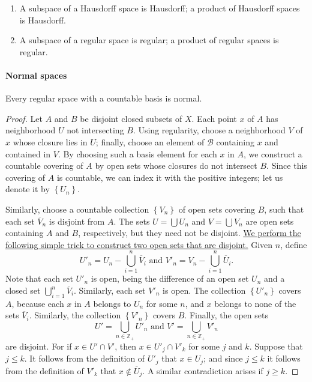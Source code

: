 \begin{theorem}
  \begin{enumerate}
    \item A subspace of a Hausdorff space is Hausdorff;
      a product of Hausdorff spaces is Hausdorff.
    \item A subspace of a regular space is regular;
      a product of regular spaces is regular.
  \end{enumerate}
\end{theorem}

\paragraph{Normal spaces}

\begin{theorem}
  Every regular space with a countable basis is normal.
\end{theorem}
\begin{proof}
  Let \( A \) and \( B \) be disjoint closed subsets of \( X \).
  Each point \( x \) of \( A \) has neighborhood \( U \) not intersecting \( B \).
  Using regularity, choose a neighborhood \( V \) of \( x \) whose closure lies in \( U \);
  finally, choose an element of \( \mathcal{B} \) containing \( x \) and contained in \( V \).
  By choosing such a basis element for each \( x \) in \( A \), we construct a countable covering of \( A \) by open sets whose closures do not intersect \( B \).
  Since this covering of \( A \) is countable, we can index it with the positive integers; let us denote it by \( \left\lbrace U_n \right\rbrace \).

  Similarly, choose a countable collection \( \left\lbrace V_n \right\rbrace \) of open sets covering \( B \), such that each set \( \overline{V}_n \) is disjoint from \( A \).
  The sets \( U = \bigcup U_n \) and \( V = \bigcup V_n \) are open sets containing \( A \) and \( B \), respectively, but they need not be disjoint.
  \underline{We perform the following simple trick to construct two open sets that are disjoint.}
  Given \( n \), define
  \[
    U'_n = U_n - \bigcup_{i = 1}^n \overline{V}_i \text{ and } V'_n = V_n - \bigcup_{i = 1}^n \overline{U}_i.
  \]
  Note that each set \( U'_n \) is open, being the difference of an open set \( U_n \) and a closed set \( \bigcup_{i=1}^n \overline{V}_i \).
  Similarly, each set \( V'_n \) is open.
  The collection \( \left\lbrace U'_n \right\rbrace \) covers \( A \), because each \( x \) in \( A \) belongs to \( U_n \) for some \( n \), and \( x \) belongs to none of the sets \( \overline{V}_i \).
  Similarly, the collection \( \left\lbrace V'_n \right\rbrace \) covers \( B \).
  Finally, the open sets
  \[
    U' = \bigcup_{n \in \mathbb{Z}_+}U'_n \text{ and } V' = \bigcup_{n \in \mathbb{Z}_+} V'_n
  \]
  are disjoint.
  For if \( x \in U' \cap V' \), then \( x \in U'_j \cap V'_k \) for some \( j \) and \( k \).
  Suppose that \( j \leq k \).
  It follows from the definition of \( U'_j \) that \( x \in U_j \);
  and since \( j \leq k \) it follows from the definition of \( V'_k \) that \( x \notin \overline{U}_j \).
  A similar contradiction arises if \( j \geq k \).
\end{proof}

